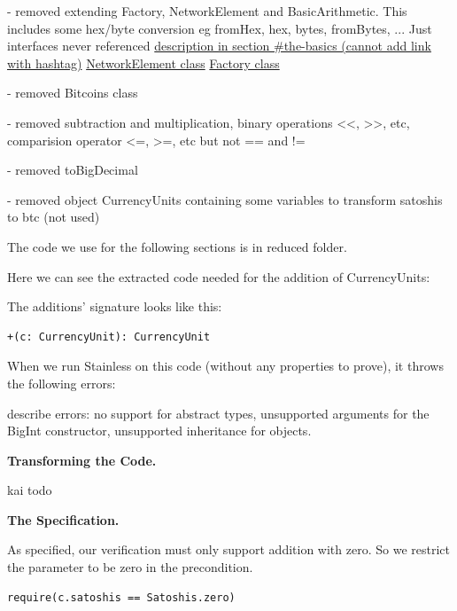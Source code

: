 \documentclass[runningheads]{llncs}
\renewcommand{\paragraph}{\textbf}%
\newcommand{\todo}[1]{{\par \color{red}#1}}
\begin{document}
  - removed extending Factory, NetworkElement and BasicArithmetic. This includes some hex/byte conversion eg fromHex, hex, bytes, fromBytes, ... Just interfaces never referenced
    \href{https://bitcoin-s.org/docs/core/core-intro\#the-basics}{description in section \#the-basics (cannot add link with hashtag)}
    \href{https://github.com/bitcoin-s/bitcoin-s/blob/master/core/src/main/scala/org/bitcoins/core/protocol/NetworkElement.scala}{NetworkElement class}
    \href{https://github.com/bitcoin-s/bitcoin-s/blob/master/core/src/main/scala/org/bitcoins/core/util/Factory.scala}{Factory class}

  - removed Bitcoins class

  - removed subtraction and multiplication, binary operations <<, >>, etc, comparision operator <=, >=, etc but not == and !=

  - removed toBigDecimal

  - removed object CurrencyUnits containing some variables to transform satoshis to btc (not used)

  The code we use for the following sections is in reduced folder.

  
Here we can see the extracted code needed for the addition of CurrencyUnits:



The additions' signature looks like this:
\begin{lstlisting}[style=scala]
  +(c: CurrencyUnit): CurrencyUnit
\end{lstlisting}

When we run Stainless on this code (without any properties to prove),
it throws the following errors: \todo{describe errors: no support for
  abstract types, unsupported arguments for the BigInt constructor,
  unsupported inheritance for objects.}

\paragraph{Transforming the Code.}

\todo{kai todo}


\paragraph{The Specification.}

As specified, our verification must only support addition with zero.
So we restrict the parameter to be zero in the precondition.
\begin{lstlisting}[style=scala]
  require(c.satoshis == Satoshis.zero)
\end{lstlisting}
\end{document}
